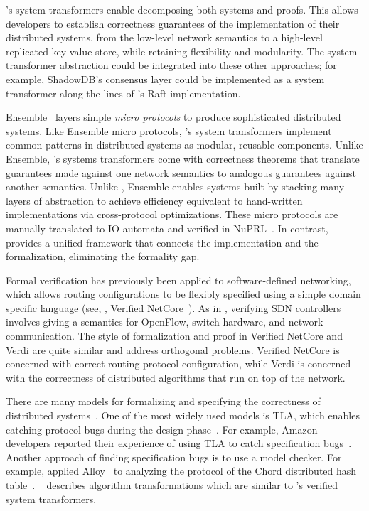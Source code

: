 \Verdi's system transformers enable decomposing both systems and proofs.
This allows developers to establish correctness guarantees of
the implementation of their distributed systems, from the low-level network
semantics to a high-level replicated key-value store, while retaining
flexibility and modularity. The system transformer abstraction could be
integrated into these other approaches; for example, ShadowDB's consensus
layer could be implemented as a system transformer along the lines of
\Verdi's Raft implementation.

Ensemble~\cite{hayden:ensemble} layers simple \textit{micro protocols}
to produce sophisticated distributed systems. Like Ensemble micro
protocols, \Verdi's system transformers implement common patterns in
distributed systems as modular, reusable components.  Unlike Ensemble,
\Verdi's systems transformers come with correctness theorems that
translate guarantees made against one network semantics to analogous
guarantees against another semantics.  Unlike \Verdi, Ensemble enables
systems built by stacking many layers of abstraction to achieve
efficiency equivalent to hand-written implementations via
cross-protocol optimizations. These micro protocols are manually
translated to IO automata and verified in
NuPRL~\cite{liu:ensemble-nuprl,ensemble-verification}. In contrast,
\Verdi provides a unified framework that connects the implementation
and the formalization, eliminating the formality gap.

 Formal verification has previously been applied to
software-defined networking, which allows routing configurations to be
flexibly specified using a simple domain specific language (see, \eg,
Verified NetCore~\cite{guha:verified-openflow}).  As in \Verdi,
verifying SDN controllers involves giving a semantics for OpenFlow,
switch hardware, and network communication. The style of formalization
and proof in Verified NetCore and Verdi are quite similar and address orthogonal
problems. Verified NetCore is concerned with correct routing protocol
configuration, while Verdi is concerned with the correctness of
distributed algorithms that run on top of the network.

There are many models for formalizing and specifying the correctness
of distributed systems~\cite{ioautomata,petrinets,pi-calculus}. One of the most
widely used models is TLA, which enables catching protocol bugs during
the design phase~\cite{lamport:thinking}.  For example, Amazon
developers reported their experience of using TLA to catch
specification bugs~\cite{Newcombe-al:CACM14}.  Another approach of finding
specification bugs is to use a model checker.  For example,
\citeauthor{zave:chord-alloy} applied Alloy~\cite{jackson:alloy} to
analyzing the protocol of the Chord distributed hash
table~\cite{zave:chord-alloy}. \citeauthor{Lynch:1996:DA:525656}~
describes algorithm transformations which are similar to \Verdi's
verified system transformers.

